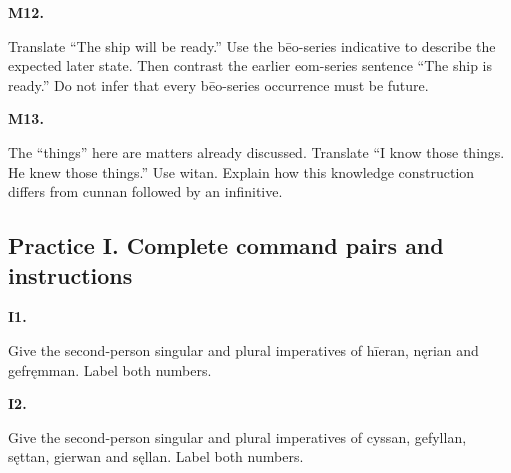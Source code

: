 \par\begin{minipage}{\linewidth}\raggedright
\textbf{M12.}

Translate “The ship will be ready.” Use the bēo-series indicative to describe the expected later state. Then contrast the earlier eom-series sentence “The ship is ready.” Do not infer that every bēo-series occurrence must be future.

\end{minipage}\par\addvspace{4pt}

\par\begin{minipage}{\linewidth}\raggedright
\textbf{M13.}

The “things” here are matters already discussed. Translate “I know those things. He knew those things.” Use witan. Explain how this knowledge construction differs from cunnan followed by an infinitive.

\end{minipage}\par\addvspace{4pt}

\subsection*{Practice I. Complete command pairs and instructions}

\par\begin{minipage}{\linewidth}\raggedright
\textbf{I1.}

Give the second-person singular and plural imperatives of hīeran, nęrian and gefręmman. Label both numbers.

\end{minipage}\par\addvspace{4pt}

\par\begin{minipage}{\linewidth}\raggedright
\textbf{I2.}

Give the second-person singular and plural imperatives of cyssan, gefyllan, sęttan, gierwan and sęllan. Label both numbers.

\end{minipage}\par\addvspace{4pt}

